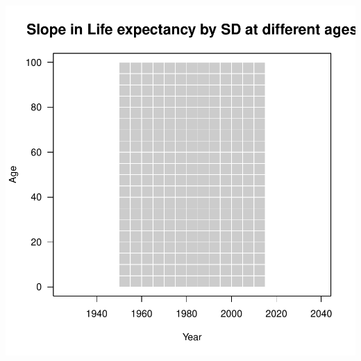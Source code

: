 \documentclass[xcolor={dvipsnames}]{beamer}
\begin{document}
\begin{frame}
		
			\begin{center}		
				\end{center}
			
\end{frame}

\begin{frame}
		
			\begin{center}		
		\includegraphics[scale=.53]{Figures/Fig6}
				\end{center}
			
\end{frame}
\end{document}
